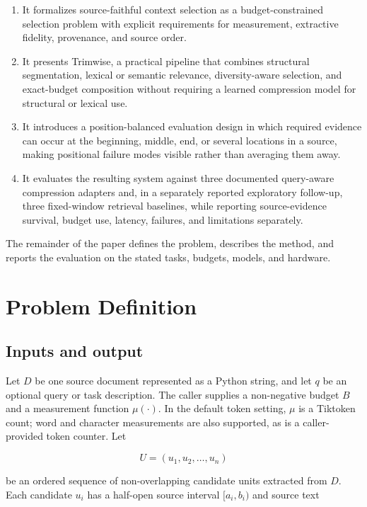 \documentclass[
]{article}
\providecommand{\tightlist}{%
  \setlength{\itemsep}{0pt}\setlength{\parskip}{0pt}}
\begin{document}
\begin{enumerate}
\def\labelenumi{\arabic{enumi}.}
\tightlist
\item
  It formalizes source-faithful context selection as a
  budget-constrained selection problem with explicit requirements for
  measurement, extractive fidelity, provenance, and source order.
\item
  It presents Trimwise, a practical pipeline that combines structural
  segmentation, lexical or semantic relevance, diversity-aware
  selection, and exact-budget composition without requiring a learned
  compression model for structural or lexical use.
\item
  It introduces a position-balanced evaluation design in which required
  evidence can occur at the beginning, middle, end, or several locations
  in a source, making positional failure modes visible rather than
  averaging them away.
\item
  It evaluates the resulting system against three documented query-aware
  compression adapters and, in a separately reported exploratory follow-up,
  three fixed-window retrieval baselines, while reporting source-evidence
  survival, budget use, latency, failures, and limitations separately.
\end{enumerate}

The remainder of the paper defines the problem, describes the method,
and reports the evaluation on the stated tasks, budgets, models, and
hardware.

\section{Problem Definition}\label{problem-definition}

\subsection{Inputs and output}\label{inputs-and-output}

Let \(D\) be one source document represented as a Python string, and let
\(q\) be an optional query or task description. The caller supplies a
non-negative budget \(B\) and a measurement function \(\mu(\cdot)\). In
the default token setting, \(\mu\) is a Tiktoken count; word and
character measurements are also supported, as is a caller-provided token
counter. Let

\[
U = (u_1, u_2, \ldots, u_n)
\]

be an ordered sequence of non-overlapping candidate units extracted from
\(D\). Each candidate \(u_i\) has a half-open source interval
\([a_i, b_i)\) and source text
\end{document}
